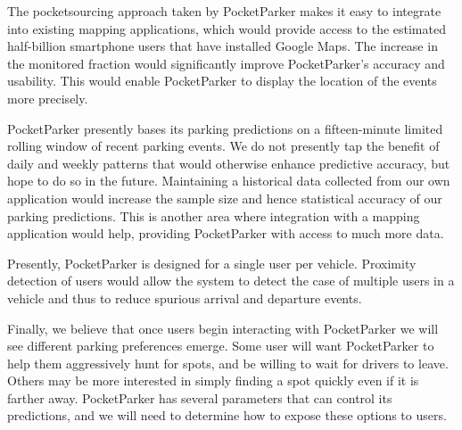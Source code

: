 \documentclass{sigchi}
\begin{document}
The pocketsourcing approach taken by PocketParker makes it easy to integrate
into existing mapping applications, which would provide access to the estimated
half-billion smartphone users that have installed Google Maps. The increase in
the monitored fraction would significantly improve
PocketParker's accuracy and usability. This would enable PocketParker to display
the location of the events more precisely.

PocketParker presently bases its parking predictions on a fifteen-minute
limited rolling window of recent parking events. We do not presently tap the
benefit of daily and weekly patterns that would otherwise enhance predictive
accuracy, but hope to do so in the future. Maintaining a historical data
collected from our own application would increase
the sample size and hence statistical accuracy of our parking predictions.
This is another area where integration with a mapping application would help,
providing PocketParker with access to much more data.

Presently, PocketParker is designed for a single user per vehicle. Proximity
detection of users would allow the system to detect the case of
multiple users in a vehicle and thus to reduce spurious arrival and departure
events.

Finally, we believe that once users begin interacting with PocketParker we
will see different parking preferences emerge. Some user will want
PocketParker to help them aggressively hunt for spots, and be willing to wait
for drivers to leave. Others may be more interested in simply finding a spot
quickly even if it is farther away. PocketParker has several parameters that
can control its predictions, and we will need to determine how to expose
these options to users.

%
%
%
%
%
%
%
\end{document}
